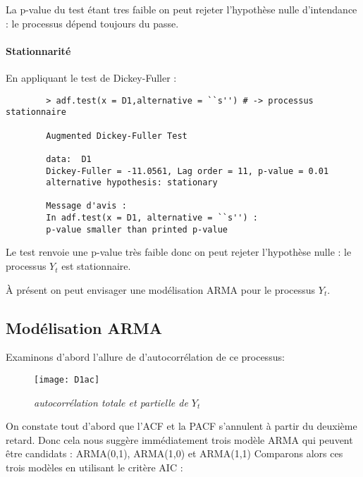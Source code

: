         La p-value du test étant tres faible on peut rejeter l'hypothèse nulle
        d'intendance : le processus dépend toujours du passe.
        \paragraph{Stationnarité}
    
        En appliquant le test de Dickey-Fuller :
        \begin{verbatim}
        > adf.test(x = D1,alternative = ``s'') # -> processus stationnaire

        Augmented Dickey-Fuller Test

        data:  D1
        Dickey-Fuller = -11.0561, Lag order = 11, p-value = 0.01
        alternative hypothesis: stationary

        Message d'avis :
        In adf.test(x = D1, alternative = ``s'') :
        p-value smaller than printed p-value
        \end{verbatim}
        Le test renvoie une p-value très faible donc on peut rejeter l'hypothèse
        nulle : le processus $Y_t$ est stationnaire.

        À présent on peut envisager une modélisation ARMA pour le processus
        $Y_t$.
    \subsection{Modélisation ARMA}        
        
        Examinons d'abord l'allure de d'autocorrélation de ce processus:
        \begin{figure}[H]
            \centering 
            \label{fig:D1ac} 
            \texttt{[image: D1ac]} 
            \caption{\it autocorrélation totale et partielle de $Y_t$ } 
        \end{figure} 

        On constate tout d'abord que l'ACF et la PACF s'annulent à partir du
        deuxième
        retard. Donc cela nous suggère immédiatement trois modèle ARMA qui peuvent
        être candidats : ARMA(0,1), ARMA(1,0) et ARMA(1,1)
        Comparons alors ces trois modèles en utilisant le critère AIC :

